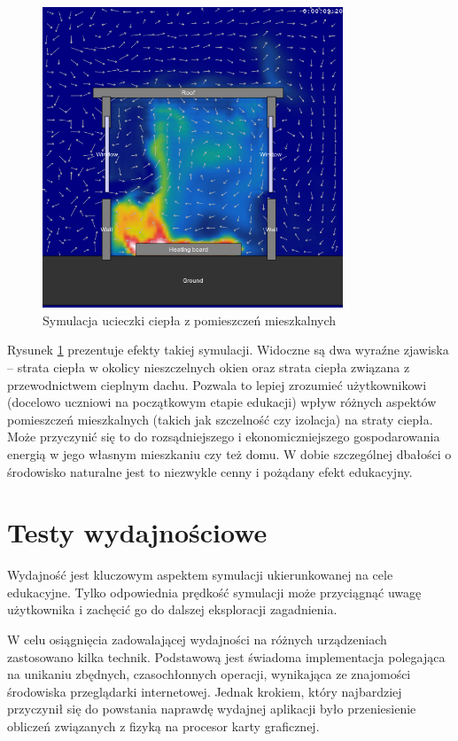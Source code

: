 \begin{figure}[!h]
\centering
\includegraphics[width=0.8\textwidth]{img/physics/wind}
\caption{Symulacja ucieczki ciepła z pomieszczeń mieszkalnych}
\label{fig:wind}
\end{figure}

Rysunek \ref{fig:wind} prezentuje efekty takiej symulacji. Widoczne są dwa
wyraźne zjawiska -- strata ciepła w okolicy nieszczelnych okien oraz strata
ciepła związana z przewodnictwem cieplnym dachu. Pozwala to lepiej zrozumieć
użytkownikowi (docelowo uczniowi na początkowym etapie edukacji) wpływ różnych
aspektów pomieszczeń mieszkalnych (takich jak szczelność czy izolacja) na straty
ciepła. Może przyczynić się to do rozsądniejszego i ekonomiczniejszego
gospodarowania energią w jego własnym mieszkaniu czy też domu. W dobie
szczególnej dbałości o środowisko naturalne jest to niezwykle cenny i pożądany
efekt edukacyjny.

\section{Testy wydajnościowe}
\label{sec:testyWydajnosciowe}

Wydajność jest kluczowym aspektem symulacji ukierunkowanej na cele edukacyjne.
Tylko odpowiednia prędkość symulacji może przyciągnąć uwagę użytkownika i
zachęcić go do dalszej eksploracji zagadnienia.

W celu osiągnięcia zadowalającej wydajności na różnych urządzeniach zastosowano
kilka technik. Podstawową jest świadoma implementacja polegająca na unikaniu
zbędnych, czasochłonnych operacji, wynikająca ze znajomości środowiska
przeglądarki internetowej. Jednak krokiem, który najbardziej przyczynił się do
powstania naprawdę wydajnej aplikacji było przeniesienie obliczeń związanych
z fizyką na procesor karty graficznej.

